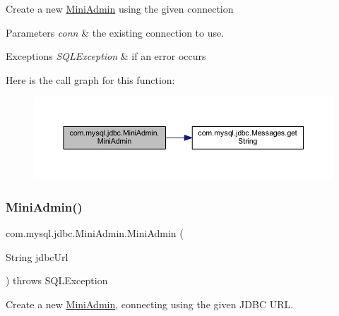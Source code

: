 Create a new \mbox{\hyperlink{classcom_1_1mysql_1_1jdbc_1_1_mini_admin}{Mini\+Admin}} using the given connection


\begin{DoxyParams}{Parameters}
{\em conn} & the existing connection to use.\\
\hline
\end{DoxyParams}

\begin{DoxyExceptions}{Exceptions}
{\em S\+Q\+L\+Exception} & if an error occurs \\
\hline
\end{DoxyExceptions}
Here is the call graph for this function\+:
\nopagebreak
\begin{figure}[H]
\begin{center}
\leavevmode
\includegraphics[width=350pt]{classcom_1_1mysql_1_1jdbc_1_1_mini_admin_a351df7f2a1e2688d3c4db674af597cb1_cgraph}
\end{center}
\end{figure}
\mbox{\label{classcom_1_1mysql_1_1jdbc_1_1_mini_admin_aa0ece5f491867b8f71b0441df770f431}} 
\subsubsection{\texorpdfstring{Mini\+Admin()}{MiniAdmin()}\hspace{0.1cm}{\footnotesize\ttfamily [2/3]}}
{\footnotesize\ttfamily com.\+mysql.\+jdbc.\+Mini\+Admin.\+Mini\+Admin (\begin{DoxyParamCaption}\item[{String}]{jdbc\+Url }\end{DoxyParamCaption}) throws S\+Q\+L\+Exception}

Create a new \mbox{\hyperlink{classcom_1_1mysql_1_1jdbc_1_1_mini_admin}{Mini\+Admin}}, connecting using the given J\+D\+BC U\+RL.


